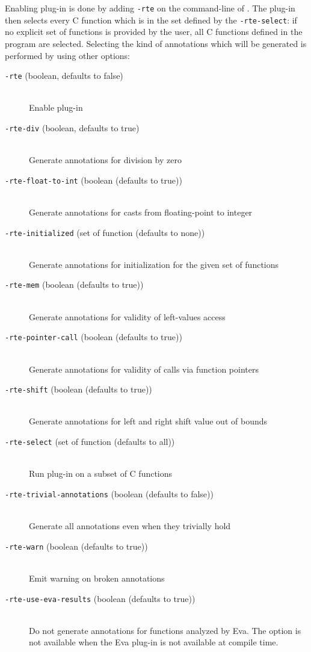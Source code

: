Enabling \rte{} plug-in is done by adding \lstinline|-rte| on the command-line
of \framac{}. The plug-in then selects every C function which is in the set
defined by the \lstinline|-rte-select|: if no explicit set of functions is
provided by the user, all C functions defined in the program are selected.
Selecting the kind of annotations which will be generated is performed by using
other \rte{} options:
\begin{description}
\item[{\tt -rte} (boolean, defaults to false)] \ \smallskip \\
     Enable \rte{} plug-in
\item[{\tt -rte-div} (boolean, defaults to true)] \ \smallskip \\
     Generate annotations for division by zero
\item[{\tt -rte-float-to-int} (boolean (defaults to true))] \ \smallskip \\
     Generate annotations for casts from floating-point to integer
\item[{\tt -rte-initialized} (set of function (defaults to none))] \ \smallskip \\
     Generate annotations for initialization for the given set of functions
\item[{\tt -rte-mem} (boolean (defaults to true))] \ \smallskip \\
     Generate annotations for validity of left-values access
\item[{\tt -rte-pointer-call} (boolean (defaults to true))] \ \smallskip \\
     Generate annotations for validity of calls via function pointers
\item[{\tt -rte-shift} (boolean (defaults to true))] \ \smallskip \\
     Generate annotations for left and right shift value out of bounds
\item[{\tt -rte-select} (set of function (defaults to all))] \ \smallskip \\
     Run plug-in on a subset of C functions
\item[{\tt -rte-trivial-annotations} (boolean (defaults to false))] \ \smallskip \\
     Generate all annotations even when they trivially hold
\item[{\tt -rte-warn} (boolean (defaults to true))] \ \smallskip \\
     Emit warning on broken annotations
\item[{\tt -rte-use-eva-results} (boolean (defaults to true))] \ \smallskip \\
     Do not generate annotations for functions analyzed by Eva. The option is
     not available when the Eva plug-in is not available at compile time.
\end{description}
